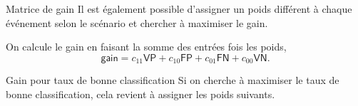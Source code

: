 \documentclass[
  ignorenonframetext,
]{beamer}
\begin{document}
\begin{frame}{Matrice de gain}
\label{matrice-de-gain}
Il est également possible d'assigner un poids différent à chaque
événement selon le scénario et chercher à maximiser le gain.

\begin{table}

\caption{\label{tbl-tableconfumat4}Pondération des entrées de la matrice
de confusion pour le calcul du gain.}


\end{table}%

On calcule le gain en faisant la somme des entrées fois les poids,
\[\textsf{gain} = c_{11}\mathsf{VP} + c_{10}\mathsf{FP} + c_{01}\mathsf{FN} + c_{00}\mathsf{VN}.\]
\end{frame}

\begin{frame}{Gain pour taux de bonne classification}
\label{gain-pour-taux-de-bonne-classification}
Si on cherche à maximiser le taux de bonne classification, cela revient
à assigner les poids suivants.

\begin{table}

\caption{\label{tbl-tableconfumat3}Pondération des entrées de la matrice
de confusion pour le calcul du taux de bonne classification.}


\end{table}%
\end{frame}
\end{document}
